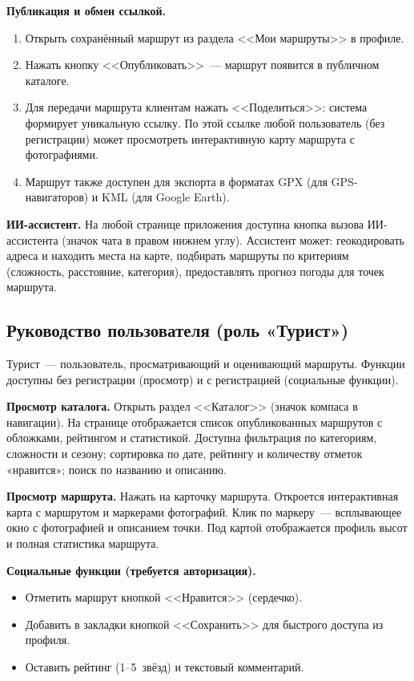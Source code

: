 \textbf{Публикация и обмен ссылкой.}
\begin{enumerate}
  \item Открыть сохранённый маршрут из раздела <<Мои маршруты>> в профиле.
  \item Нажать кнопку <<Опубликовать>>~--- маршрут появится в публичном каталоге.
  \item Для передачи маршрута клиентам нажать <<Поделиться>>: система формирует уникальную ссылку. По этой ссылке любой пользователь (без регистрации) может просмотреть интерактивную карту маршрута с фотографиями.
  \item Маршрут также доступен для экспорта в форматах GPX (для GPS-навигаторов) и KML (для Google Earth).
\end{enumerate}

\textbf{ИИ-ассистент.} На любой странице приложения доступна кнопка вызова ИИ-ассистента (значок чата в правом нижнем углу). Ассистент может: геокодировать адреса и находить места на карте, подбирать маршруты по критериям (сложность, расстояние, категория), предоставлять прогноз погоды для точек маршрута.

\subsection{Руководство пользователя (роль «Турист»)}

Турист~--- пользователь, просматривающий и оценивающий маршруты. Функции доступны без регистрации (просмотр) и с регистрацией (социальные функции).

\textbf{Просмотр каталога.} Открыть раздел <<Каталог>> (значок компаса в навигации). На странице отображается список опубликованных маршрутов с обложками, рейтингом и статистикой. Доступна фильтрация по категориям, сложности и сезону; сортировка по дате, рейтингу и количеству отметок «нравится»; поиск по названию и описанию.

\textbf{Просмотр маршрута.} Нажать на карточку маршрута. Откроется интерактивная карта с маршрутом и маркерами фотографий. Клик по маркеру~--- всплывающее окно с фотографией и описанием точки. Под картой отображается профиль высот и полная статистика маршрута.

\textbf{Социальные функции (требуется авторизация).}
\begin{itemize}
  \item Отметить маршрут кнопкой <<Нравится>> (сердечко).
  \item Добавить в закладки кнопкой <<Сохранить>> для быстрого доступа из профиля.
  \item Оставить рейтинг (1--5~звёзд) и текстовый комментарий.
\end{itemize}

